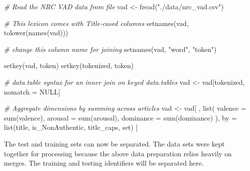 \documentclass[
]{article}
\newenvironment{Shaded}{\begin{snugshade}}{\end{snugshade}}
\newcommand{\AttributeTok}[1]{\textcolor[rgb]{0.77,0.63,0.00}{#1}}
\newcommand{\CommentTok}[1]{\textcolor[rgb]{0.56,0.35,0.01}{\textit{#1}}}
\newcommand{\ConstantTok}[1]{\textcolor[rgb]{0.00,0.00,0.00}{#1}}
\newcommand{\FunctionTok}[1]{\textcolor[rgb]{0.00,0.00,0.00}{#1}}
\newcommand{\NormalTok}[1]{#1}
\newcommand{\OtherTok}[1]{\textcolor[rgb]{0.56,0.35,0.01}{#1}}
\newcommand{\StringTok}[1]{\textcolor[rgb]{0.31,0.60,0.02}{#1}}
\begin{document}
\begin{Shaded}
\begin{Highlighting}[]
\CommentTok{\# Read the NRC VAD data from file}
\NormalTok{vad }\OtherTok{\textless{}{-}} \FunctionTok{fread}\NormalTok{(}\StringTok{"./data/nrc\_vad.csv"}\NormalTok{)}

\CommentTok{\# This lexicon comes with Title{-}cased columns}
\FunctionTok{setnames}\NormalTok{(vad, }\FunctionTok{tolower}\NormalTok{(}\FunctionTok{names}\NormalTok{(vad)))}

\CommentTok{\# change this column name for joining}
\FunctionTok{setnames}\NormalTok{(vad, }\StringTok{"word"}\NormalTok{, }\StringTok{"token"}\NormalTok{)}

\FunctionTok{setkey}\NormalTok{(vad, token)}
\FunctionTok{setkey}\NormalTok{(tokenized, token)}

\CommentTok{\# data.table syntax for an inner join on keyed data.tables}
\NormalTok{vad }\OtherTok{\textless{}{-}}\NormalTok{ vad[tokenized, nomatch }\OtherTok{=} \ConstantTok{NULL}\NormalTok{]}

\CommentTok{\# Aggregate dimensions by summing across articles}
\NormalTok{vad }\OtherTok{\textless{}{-}}\NormalTok{ vad[}
\NormalTok{  ,}
  \FunctionTok{list}\NormalTok{(}
    \AttributeTok{valence =} \FunctionTok{sum}\NormalTok{(valence),}
    \AttributeTok{arousal =} \FunctionTok{sum}\NormalTok{(arousal),}
    \AttributeTok{dominance =} \FunctionTok{sum}\NormalTok{(dominance)}
\NormalTok{  ),}
\NormalTok{  by }\OtherTok{=} \FunctionTok{list}\NormalTok{(title, is\_NonAuthentic, title\_caps, set)}
\NormalTok{]}
\end{Highlighting}
\end{Shaded}

The test and training sets can now be separated. The data sets were kept
together for processing because the above data preparation relies
heavily on merges. The training and testing identifiers will be
separated here.
\end{document}
